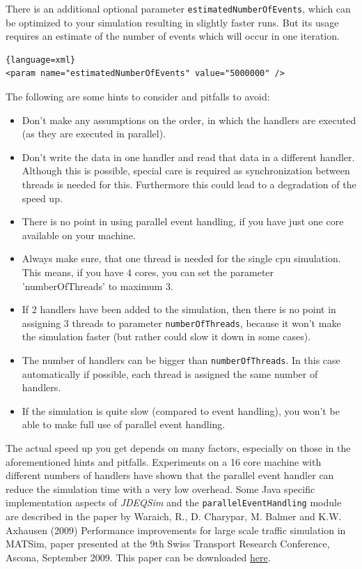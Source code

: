 There is an additional optional parameter \texttt{estimatedNumberOfEvents}, which can be optimized to your simulation resulting in slightly faster runs. But its usage requires an estimate of the number of events which will occur in one iteration.
\begin{lstlisting}{language=xml}
<param name="estimatedNumberOfEvents" value="5000000" />
\end{lstlisting}
The following are some hints to consider and pitfalls to avoid:
\begin{itemize}
\item Don't make any  assumptions on the order, in which the handlers are executed (as they are executed in parallel).
\item Don't write the data in one handler and read that data in a different handler. Although this is possible, special care is required as synchronization between threads is needed for this. Furthermore this could lead to a degradation of the speed up.
\item There is no point in using parallel event handling, if you have just one core available on your machine.
\item Always make sure, that one thread is needed for the single cpu simulation. This means, if you have 4 cores, you can set the parameter 'numberOfThreads' to maximum 3.
\item If 2 handlers have been added to the simulation, then there is no point in assigning 3 threads to parameter \texttt{numberOfThreads}, because it won't make the simulation faster (but rather could slow it down in some cases).
\item The number of handlers can be bigger than \texttt{numberOfThreads}. In this case automatically if possible, each thread is assigned the same number of handlers. 
\item If the simulation is quite slow (compared to event handling), you won't be able to make full use of parallel event handling.
\end{itemize} 
The actual speed up you get depends on many factors, especially on those in the aforementioned hints and pitfalls. Experiments on a 16 core machine with different numbers of handlers have shown that the parallel event handler can reduce the simulation time with a very low overhead. Some Java specific implementation aspects of \emph{JDEQSim} and the \texttt{parallelEventHandling} module are described in the paper by Waraich, R., D. Charypar, M. Balmer and K.W. Axhausen (2009) Performance improvements for large scale traffic simulation in MATSim, paper presented at the 9th Swiss Transport Research Conference, Ascona, September 2009. This paper can be downloaded \href{http://www.ivt.ethz.ch/vpl/publications/reports/ab565.pdf}{here}. 

